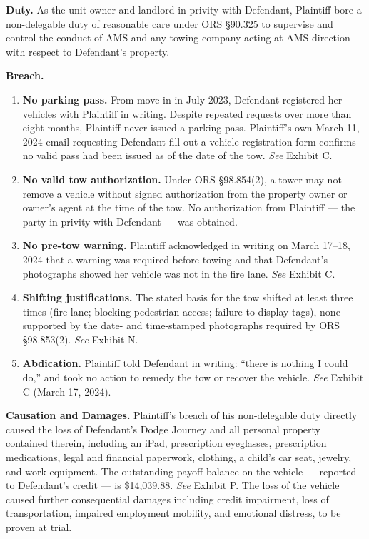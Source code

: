\documentclass[12pt,letterpaper]{article}
\begin{document}
	\textbf{Duty.} As the unit owner and landlord in privity with Defendant, Plaintiff bore a non-delegable duty of reasonable care under ORS \S90.325 to supervise and control the conduct of AMS and any towing company acting at AMS direction with respect to Defendant's property.
	
	\textbf{Breach.}
	
	\begin{enumerate}[label=(\alph*)]
		\item \textbf{No parking pass.} From move-in in July 2023, Defendant registered her vehicles with Plaintiff in writing. Despite repeated requests over more than eight months, Plaintiff never issued a parking pass. Plaintiff's own March 11, 2024 email requesting Defendant fill out a vehicle registration form confirms no valid pass had been issued as of the date of the tow. \textit{See} Exhibit C.
		\item \textbf{No valid tow authorization.} Under ORS \S98.854(2), a tower may not remove a vehicle without signed authorization from the property owner or owner's agent at the time of the tow. No authorization from Plaintiff --- the party in privity with Defendant --- was obtained.
		\item \textbf{No pre-tow warning.} Plaintiff acknowledged in writing on March 17--18, 2024 that a warning was required before towing and that Defendant's photographs showed her vehicle was not in the fire lane. \textit{See} Exhibit C.
		\item \textbf{Shifting justifications.} The stated basis for the tow shifted at least three times (fire lane; blocking pedestrian access; failure to display tags), none supported by the date- and time-stamped photographs required by ORS \S98.853(2). \textit{See} Exhibit N.
		\item \textbf{Abdication.} Plaintiff told Defendant in writing: ``there is nothing I could do,'' and took no action to remedy the tow or recover the vehicle. \textit{See} Exhibit C (March 17, 2024).
	\end{enumerate}
	
	\textbf{Causation and Damages.} Plaintiff's breach of his non-delegable duty directly caused the loss of Defendant's Dodge Journey and all personal property contained therein, including an iPad, prescription eyeglasses, prescription medications, legal and financial paperwork, clothing, a child's car seat, jewelry, and work equipment. The outstanding payoff balance on the vehicle --- reported to Defendant's credit --- is \$14,039.88. \textit{See} Exhibit P. The loss of the vehicle caused further consequential damages including credit impairment, loss of transportation, impaired employment mobility, and emotional distress, to be proven at trial.
	
\end{document}
